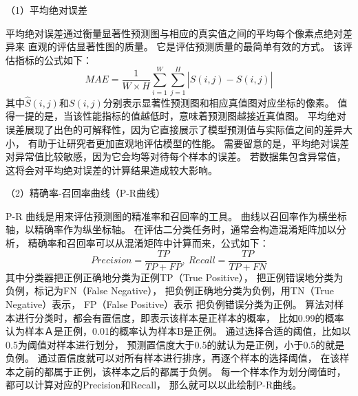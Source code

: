 （1）平均绝对误差\par
平均绝对误差通过衡量显著性预测图与相应的真实值之间的平均每个像素点绝对差异来
直观的评估显著性图的质量。
它是评估预测质量的最简单有效的方式。
该评估指标的公式如下：
\begin{equation}
	MAE=\frac{1}{W \times H}\sum_{i=1}^{W} \sum_{j=1}^{H} \left |  \hat{S} (i,j) - S(i,j)\right | 
\end{equation}
%
%
其中$\hat{S}(i,j)$和$S(i,j)$分别表示显著性预测图和相应真值图对应坐标的像素。
值得一提的是，当该性能指标的值越低时，意味着预测图越接近真值图。
平均绝对误差展现了出色的可解释性，因为它直接展示了模型预测值与实际值之间的差异大小，
有助于让研究者更加直观地评估模型的性能。
需要留意的是，平均绝对误差对异常值比较敏感，因为它会均等对待每个样本的误差。
若数据集包含异常值，这将会对平均绝对误差的计算结果造成较大影响。







（2）精确率-召回率曲线（P-R曲线）\par
%
%
P-R 曲线是用来评估预测图的精准率和召回率的工具。
曲线以召回率作为横坐标轴，以精确率作为纵坐标轴。
在评估二分类任务时，通常会构造混淆矩阵加以分析，
精确率和召回率可以从混淆矩阵中计算而来，公式如下：
%
%
\begin{equation}
	Precision = \frac{TP}{TP + FP},~Recall = \frac{TP}{TP+FN}
\end{equation}
%
%
其中分类器把正例正确地分类为正例TP（True Positive），
把正例错误地分类为负例，标记为FN（False Negative），
把负例正确地分类为负例，用TN（True Negative）表示，
FP（False Positive）表示
把负例错误分类为正例。
算法对样本进行分类时，都会有置信度，即表示该样本是正样本的概率，
比如0.99的概率认为样本Ａ是正例，0.01的概率认为样本B是正例。
通过选择合适的阈值，比如以0.5为阈值对样本进行划分，
预测置信度大于0.5的就认为是正例，小于0.5的就是负例。
通过置信度就可以对所有样本进行排序，再逐个样本的选择阈值，
在该样本之前的都属于正例，该样本之后的都属于负例。
每一个样本作为划分阈值时，都可以计算对应的Precision和Recall，
那么就可以以此绘制P-R曲线。\par






